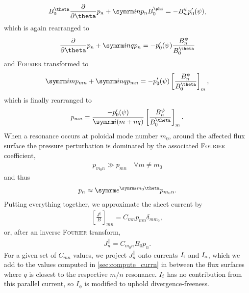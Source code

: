 \begin{gather}
  B_{0}^{\theta} \pd{\theta} p_{n} + \im n p_{n} B_{0}^{\phi} = -B_{n}^{\psi} p_{0}'(\psi),
\end{gather}
which is again rearranged to
\begin{gather}
  \pd{\theta} p_{n} + \im n q p_{n} = -p_{0}'(\psi) \frac{B_{n}^{\psi}}{B_{0}^{\theta}}
\end{gather}
and \textsc{Fourier} transformed to
\begin{gather}
  \im m p_{m n} + \im n q p_{m n} = -p_{0}'(\psi) \left [ \frac{B_{n}^{\psi}}{B_{0}^{\theta}} \right ]_{m},
\end{gather}
which is finally rearranged to
\begin{gather}
  p_{m n} = \frac{-p_{0}'(\psi)}{\im (m + n q)} \left [ \frac{B_{n}^{\psi}}{B_{0}^{\theta}} \right ]_{m}.
\end{gather}
When a resonance occurs at poloidal mode number $m_{0}$, around the affected flux surface the pressure perturbation is dominated by the associated \textsc{Fourier} coefficient,
\begin{gather}
  p_{m_{0} n} \gg p_{m n} \quad \forall m \neq m_{0}
\end{gather}
and thus
\begin{gather}
  p_{n} \approx \e^{\im m_{0} \theta} p_{m_{0} n}.
\end{gather}
Putting everything together, we approximate the sheet current by
\begin{gather}
  \left [ \frac{J^{\parallel}}{B} \right ]_{m n} = C_{m n} p_{m n} \delta_{m m_{0}},
\end{gather}
or, after an inverse \textsc{Fourier} transform,
\begin{gather}
  J_{n}^{\parallel} = C_{m_{0} n} B_{0} p_{n}. \label{eq:sheet-currents}
\end{gather}
For a given set of $C_{m n}$ values, we project $J_{n}^{\parallel}$ onto currents $I_{\textrm{i}}$ and $I_{\textrm{o}}$, which we add to the values computed in \cref{sec:compute_currn} in between the flux surfaces where $q$ is closest to the respective $m/n$ resonance. $I_{\textrm{f}}$ has no contribution from this parallel current, so $I_{\phi}$ is modified to uphold divergence-freeness.

